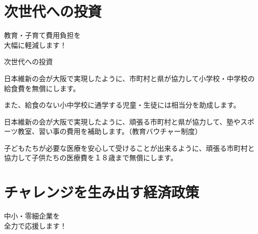 \documentclass[dvipdfmx]{beamer}
\begin{document}
\section{次世代への投資}
    \begin{frame}{}{}
        \sectionpage
        \begin{center}
            \begin{large}
                \alert{教育・子育て費用負担を}\\\alert{大幅に軽減します！}
            \end{large}
        \end{center}
    \end{frame}

    \begin{frame}{次世代への投資}{}
        \begin{small}
            \begin{description}
                \setlength{\parsep}{.5mm}
                \setlength{\itemsep}{2mm}
                \item[給食費の無償化] \mbox{}\par
                日本維新の会が大阪で実現したように、市町村と県が協力して小学校・中学校の給食費を無償にします。\par
                また、給食のない小中学校に通学する児童・生徒には相当分を助成します。
                \item[塾代、スポーツ教室、習い事への補助] \mbox{}\par
                日本維新の会が大阪で実現したように、頑張る市町村と県が協力して、塾やスポーツ教室、習い事の費用を補助します。（教育バウチャー制度）
                \item[１８歳まで医療費無償化] \mbox{}\par
                子どもたちが必要な医療を安心して受けることが出来るように、頑張る市町村と協力して子供たちの医療費を１８歳まで無償にします。
            \end{description}
        \end{small}
    \end{frame}

\section{チャレンジを生み出す経済政策}
    \begin{frame}{}{}
        \sectionpage
        \begin{center}
            \begin{large}
                \alert{中小・零細企業を}\\\alert{全力で応援します！}
            \end{large}
        \end{center}
    \end{frame}
\end{document}
